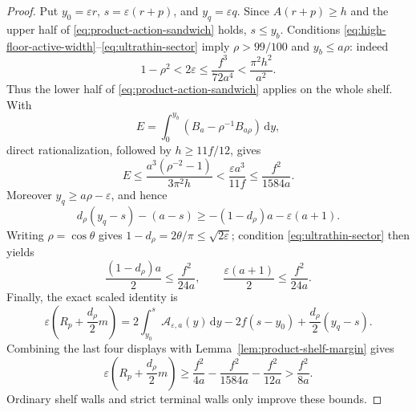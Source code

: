 \documentclass[11pt]{article}
\theoremstyle{remark}
\newcommand{\dd}{\,\mathrm d}
\begin{document}
\begin{proof}
Put $y_0=\varepsilon r$, $s=\varepsilon(r+p)$, and
$y_q=\varepsilon q$.  Since $A(r+p)\geq h$ and the upper half of
\eqref{eq:product-action-sandwich} holds, $s\leq y_b$.  Conditions
\eqref{eq:high-floor-active-width}--\eqref{eq:ultrathin-sector} imply
$\rho>99/100$ and $y_b\leq a\rho$: indeed
\[
 1-\rho^2<2\varepsilon\leq\frac{f^3}{72a^4}
 <\frac{\pi^2h^2}{a^2}.
\]
Thus the lower half of \eqref{eq:product-action-sandwich} applies on the
whole shelf.  With
\[
 E=\int_0^{y_b}\left(B_a-\rho^{-1}B_{a\rho}\right)\dd y,
\]
direct rationalization, followed by $h\geq11f/12$, gives
\begin{equation}
 E\leq\frac{a^3(\rho^{-2}-1)}{3\pi^2h}
 <\frac{\varepsilon a^3}{11f}
 \leq\frac{f^2}{1584a}.
 \label{eq:product-transfer-error}
\end{equation}
Moreover $y_q\geq a\rho-\varepsilon$, and hence
\begin{equation}
 d_\rho(y_q-s)-(a-s)
 \geq-(1-d_\rho)a-\varepsilon(a+1).
 \label{eq:terminal-coordinate-error}
\end{equation}
Writing $\rho=\cos\theta$ gives
$1-d_\rho=2\theta/\pi\leq\sqrt{2\varepsilon}$; condition
\eqref{eq:ultrathin-sector} then yields
\[
 \frac{(1-d_\rho)a}{2}\leq\frac{f^2}{24a},
 \qquad
 \frac{\varepsilon(a+1)}2\leq\frac{f^2}{24a}.
\]
Finally, the exact scaled identity is
\[
 \varepsilon\left(R_p+\frac{d_\rho}{2}m\right)
 =2\int_{y_0}^{s}\mathcal A_{\varepsilon,a}(y)\dd y
 -2f(s-y_0)+\frac{d_\rho}{2}(y_q-s).
\]
Combining the last four displays with Lemma~\ref{lem:product-shelf-margin}
gives
\[
 \varepsilon\left(R_p+\frac{d_\rho}{2}m\right)
 \geq\frac{f^2}{4a}-\frac{f^2}{1584a}-\frac{f^2}{12a}
 >\frac{f^2}{8a}.
\]
Ordinary shelf walls and strict terminal walls only improve these bounds.
\end{proof}
\end{document}
